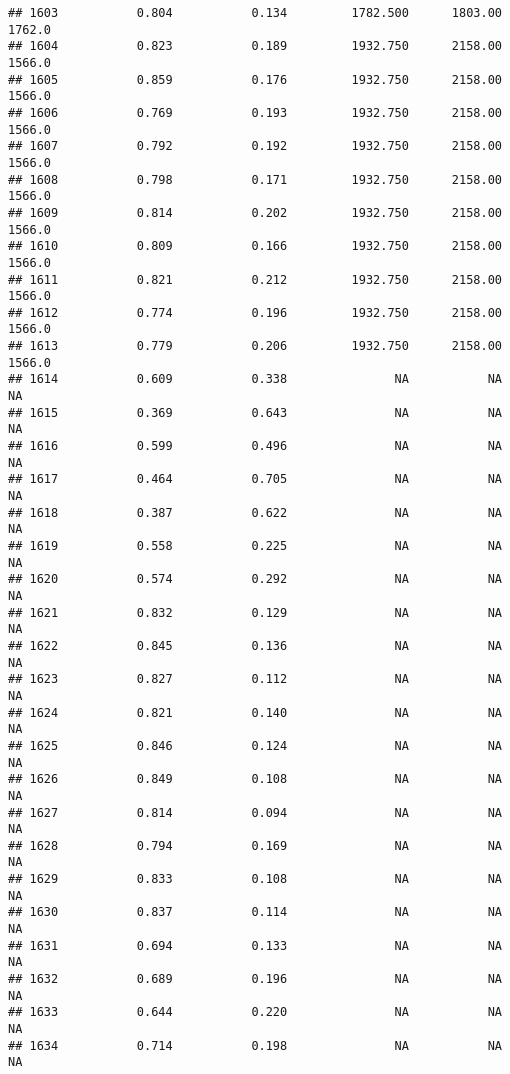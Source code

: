 \documentclass[
]{article}
\begin{document}
\begin{verbatim}
## 1603           0.804           0.134         1782.500      1803.00       1762.0
## 1604           0.823           0.189         1932.750      2158.00       1566.0
## 1605           0.859           0.176         1932.750      2158.00       1566.0
## 1606           0.769           0.193         1932.750      2158.00       1566.0
## 1607           0.792           0.192         1932.750      2158.00       1566.0
## 1608           0.798           0.171         1932.750      2158.00       1566.0
## 1609           0.814           0.202         1932.750      2158.00       1566.0
## 1610           0.809           0.166         1932.750      2158.00       1566.0
## 1611           0.821           0.212         1932.750      2158.00       1566.0
## 1612           0.774           0.196         1932.750      2158.00       1566.0
## 1613           0.779           0.206         1932.750      2158.00       1566.0
## 1614           0.609           0.338               NA           NA           NA
## 1615           0.369           0.643               NA           NA           NA
## 1616           0.599           0.496               NA           NA           NA
## 1617           0.464           0.705               NA           NA           NA
## 1618           0.387           0.622               NA           NA           NA
## 1619           0.558           0.225               NA           NA           NA
## 1620           0.574           0.292               NA           NA           NA
## 1621           0.832           0.129               NA           NA           NA
## 1622           0.845           0.136               NA           NA           NA
## 1623           0.827           0.112               NA           NA           NA
## 1624           0.821           0.140               NA           NA           NA
## 1625           0.846           0.124               NA           NA           NA
## 1626           0.849           0.108               NA           NA           NA
## 1627           0.814           0.094               NA           NA           NA
## 1628           0.794           0.169               NA           NA           NA
## 1629           0.833           0.108               NA           NA           NA
## 1630           0.837           0.114               NA           NA           NA
## 1631           0.694           0.133               NA           NA           NA
## 1632           0.689           0.196               NA           NA           NA
## 1633           0.644           0.220               NA           NA           NA
## 1634           0.714           0.198               NA           NA           NA

\end{verbatim}
\end{document}
